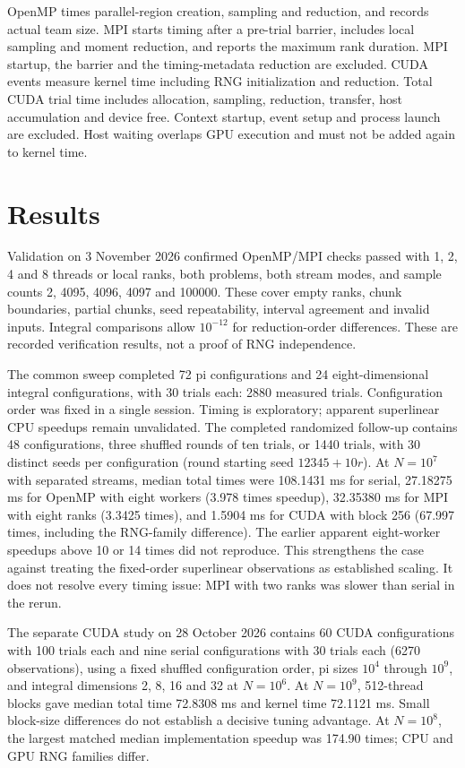 OpenMP times parallel-region creation, sampling and reduction, and records
actual team size. MPI starts timing after a pre-trial barrier, includes local
sampling and moment reduction, and reports the maximum rank duration.
MPI startup, the barrier and the timing-metadata reduction are excluded.
CUDA events measure kernel time including RNG initialization and reduction.
Total CUDA trial time includes allocation, sampling, reduction, transfer,
host accumulation and device free. Context startup, event setup and process
launch are excluded. Host waiting overlaps GPU execution and must not be
added again to kernel time.

\section{Results}
Validation on 3 November 2026 confirmed OpenMP/MPI checks passed with 1, 2, 4 and 8 threads or local ranks,
both problems, both stream modes, and sample counts
2, 4095, 4096, 4097 and 100000. These cover empty ranks, chunk boundaries,
partial chunks, seed repeatability, interval agreement and invalid inputs.
Integral comparisons allow $10^{-12}$ for reduction-order differences.
These are recorded verification results, not a proof of RNG independence.

The common sweep completed 72 pi configurations and 24 eight-dimensional
integral configurations, with 30 trials each: 2880 measured trials.
Configuration order was fixed in a single session. Timing is exploratory;
apparent superlinear CPU speedups remain unvalidated.
The completed randomized follow-up contains 48 configurations,
three shuffled rounds of ten trials, or 1440 trials, with 30 distinct seeds
per configuration (round starting seed $12345+10r$).
At $N=10^7$ with separated streams, median total times were 108.1431 ms
for serial, 27.18275 ms for OpenMP with eight workers (3.978 times speedup),
32.35380 ms for MPI with eight ranks (3.3425 times), and 1.5904 ms for
CUDA with block 256 (67.997 times, including the RNG-family difference).
The earlier apparent eight-worker speedups above 10 or 14 times did not
reproduce. This strengthens the case against treating the fixed-order
superlinear observations as established scaling. It does not resolve every
timing issue: MPI with two ranks was slower than serial in the rerun.

The separate CUDA study on 28 October 2026 contains
60 CUDA configurations with 100 trials each and nine serial configurations
with 30 trials each (6270 observations), using a fixed shuffled configuration order, pi sizes
$10^4$ through $10^9$, and integral dimensions 2, 8, 16 and 32 at $N=10^6$.
At $N=10^9$, 512-thread blocks gave median total time 72.8308 ms and
kernel time 72.1121 ms. Small block-size differences do not establish a
decisive tuning advantage. At $N=10^8$, the largest matched median
implementation speedup was 174.90 times; CPU and GPU RNG families differ.

